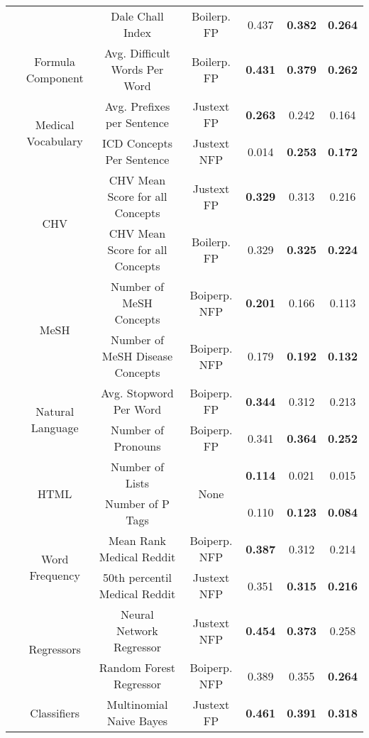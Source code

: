\begin{table*}[t]
{\begin{tabular}{c|c|c|c|c|c|c}
 &  & Dale Chall Index & Boilerp. FP & 0.437 & \textbf{0.382} & \textbf{0.264}\tabularnewline
\cmidrule{2-7} 
 & Formula Component & Avg. Difficult Words Per Word & Boilerp. FP & \textbf{0.431} & \textbf{0.379} & \textbf{0.262}\tabularnewline
\cmidrule{2-7} 
 & \multirow{2}{*}{Medical Vocabulary} & Avg. Prefixes per Sentence & Justext FP & \textbf{0.263} & 0.242 & 0.164\tabularnewline
 &  & ICD Concepts Per Sentence & Justext NFP & 0.014 & \textbf{0.253} & \textbf{0.172}\tabularnewline
\cmidrule{2-7} 
 & \multirow{2}{*}{CHV} & CHV Mean Score for all Concepts & Justext FP & \textbf{0.329} & 0.313 & 0.216\tabularnewline
 &  & CHV Mean Score for all Concepts & Boilerp. FP & 0.329 & \textbf{0.325} & \textbf{0.224}\tabularnewline
\cmidrule{2-7} 
 & \multirow{2}{*}{MeSH} & Number of MeSH Concepts & Boiperp. NFP & \textbf{0.201} & 0.166 & 0.113\tabularnewline
 &  & Number of MeSH Disease Concepts & Boiperp. NFP & 0.179 & \textbf{0.192} & \textbf{0.132}\tabularnewline
\cmidrule{2-7} 
 & \multirow{2}{*}{Natural Language} & Avg. Stopword Per Word & Boiperp. FP & \textbf{0.344} & 0.312 & 0.213\tabularnewline
 &  & Number of Pronouns & Boiperp. FP & 0.341 & \textbf{0.364} & \textbf{0.252}\tabularnewline
\cmidrule{2-7} 
 & \multirow{2}{*}{HTML} & Number of Lists & \multirow{2}{*}{None} & \textbf{0.114} & 0.021 & 0.015\tabularnewline
 &  & Number of P Tags &  & 0.110 & \textbf{0.123} & \textbf{0.084}\tabularnewline
\cmidrule{2-7} 
 & \multirow{2}{*}{Word Frequency} & Mean Rank Medical Reddit & Boiperp. NFP & \textbf{0.387} & 0.312 & 0.214\tabularnewline
 &  & 50th percentil Medical Reddit & Justext NFP & 0.351 & \textbf{0.315} & \textbf{0.216}\tabularnewline
\cmidrule{2-7} 
 & \multirow{2}{*}{Regressors} & Neural Network Regressor & Justext NFP & \textbf{0.454} & \textbf{0.373} & 0.258\tabularnewline
 &  & Random Forest Regressor & Boiperp. NFP & 0.389 & 0.355 & \textbf{0.264}\tabularnewline
\cmidrule{2-7} 
 & Classifiers & Multinomial Naive Bayes & Justext FP & \textbf{0.461} & \textbf{0.391} & \textbf{0.318}\tabularnewline
\bottomrule
\end{tabular}
} %
\end{table*}

